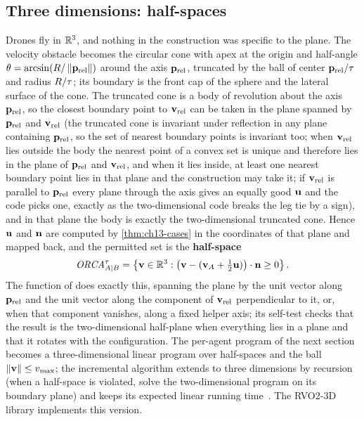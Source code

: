 \subsection{Three dimensions: half-spaces}
\label{sec:ch13-3d}

Drones fly in $\mathbb{R}^3$, and nothing in the construction was specific to the
plane. The velocity obstacle becomes the circular cone with apex at the
origin and half-angle $\theta = \arcsin(R/\left\lVert \mathbf{p}_{\mathrm{rel}} \right\rVert)$ around
the axis $\mathbf{p}_{\mathrm{rel}}$, truncated by the ball of center
$\mathbf{p}_{\mathrm{rel}}/\tau$ and radius $R/\tau$; its boundary is the front cap
of the sphere and the lateral surface of the cone. The truncated cone is a
body of revolution about the axis $\mathbf{p}_{\mathrm{rel}}$, so the closest
boundary point to $\mathbf{v}_{\mathrm{rel}}$ can be taken in the plane spanned by
$\mathbf{p}_{\mathrm{rel}}$ and $\mathbf{v}_{\mathrm{rel}}$ (the truncated cone is invariant
under reflection in any plane containing $\mathbf{p}_{\mathrm{rel}}$, so the set of
nearest boundary points is invariant too; when $\mathbf{v}_{\mathrm{rel}}$ lies
outside the body the nearest point of a convex set is unique and therefore
lies in the plane of $\mathbf{p}_{\mathrm{rel}}$ and $\mathbf{v}_{\mathrm{rel}}$, and when
it lies inside, at least one nearest boundary point lies in that plane and the
construction may take it; if $\mathbf{v}_{\mathrm{rel}}$ is parallel to
$\mathbf{p}_{\mathrm{rel}}$ every plane through the axis gives an equally good
$\mathbf{u}$ and the code picks one, exactly as the two-dimensional code breaks
the leg tie by a sign), and in that plane the body is exactly the
two-dimensional truncated cone. Hence $\mathbf{u}$ and $\mathbf{n}$ are computed by
\cref{thm:ch13-cases} in the coordinates of that plane and mapped back, and
the permitted set is the \textbf{half-space}
\begin{equation}
  \mathit{ORCA}^{\tau}_{A|B} = \left\{ \mathbf{v} \in \mathbb{R}^3 : \bigl(\mathbf{v} - (\mathbf{v}_A + \tfrac12\mathbf{u})\bigr)\cdot\mathbf{n} \ge 0 \right\}.
  \label{eq:ch13-orca-3d}
\end{equation}
The function  of  does exactly
this, spanning the plane by the unit vector along $\mathbf{p}_{\mathrm{rel}}$ and the
unit vector along the component of $\mathbf{v}_{\mathrm{rel}}$ perpendicular to it,
or, when that component vanishes, along a fixed helper axis; its self-test
checks that the result is the two-dimensional
half-plane when everything lies in a plane and that it rotates with the
configuration. The per-agent program of the next section becomes a
three-dimensional linear program over half-spaces and the ball
$\left\lVert \mathbf{v} \right\rVert \le v_{\max}$; the incremental algorithm extends to three
dimensions by recursion (when a half-space is violated, solve the
two-dimensional program on its boundary plane) and keeps its expected linear
running time~\cite{seidel1991small,deberg2008computational}. The RVO2-3D
library implements this version.

